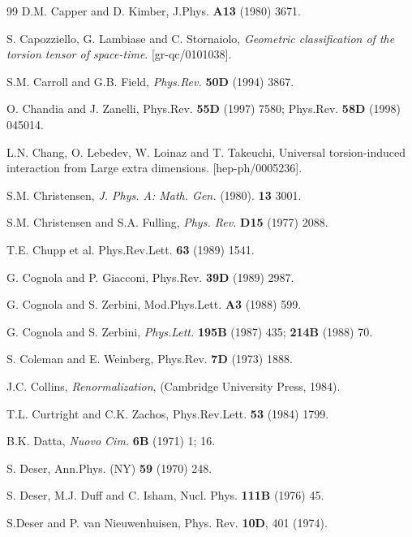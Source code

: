 \begin{thebibliography}{99}
D.M. Capper and D. Kimber, J.Phys. {\bf A13} (1980) 3671.

 S. Capozziello, G. Lambiase and C. Stornaiolo,
{\sl Geometric classification of the torsion tensor of space-time}.
[gr-qc/0101038].

S.M. Carroll and G.B. Field, {\sl Phys.Rev.} {\bf 50D} (1994) 3867.

O. Chandia and J. Zanelli, Phys.Rev. {\bf 55D} (1997) 7580;
Phys.Rev. {\bf 58D} (1998) 045014.

L.N. Chang, O. Lebedev, W. Loinaz and T. Takeuchi,
Universal torsion-induced interaction from Large extra dimensions.
[hep-ph/0005236]. 

 S.M. Christensen, {\sl J. Phys. A: Math. Gen.} (1980).
{\bf 13} 3001.

 S.M. Christensen and S.A. Fulling, 
{\sl Phys. Rev.} {\bf D15} (1977) 2088.

T.E.  Chupp et al. Phys.Rev.Lett. 
{\bf 63} (1989) 1541.

G. Cognola and P. Giacconi,  Phys.Rev. {\bf 39D} (1989) 2987.

G. Cognola and S. Zerbini, Mod.Phys.Lett. {\bf A3} (1988) 599.

 G. Cognola and S. Zerbini,
{\sl Phys.Lett.} {\bf 195B} (1987) 435; {\bf 214B} (1988) 70.

S. Coleman and E. Weinberg, Phys.Rev. {\bf 7D} (1973) 1888.

 J.C. Collins, {\sl Renormalization}, (Cambridge 
University Press, 1984). 

 T.L. Curtright and C.K. Zachos, 
Phys.Rev.Lett. {\bf 53} (1984) 1799. %


B.K. Datta, {\sl Nuovo Cim.} {\bf 6B} (1971) 1; 16.

 S. Deser, Ann.Phys. (NY) {\bf 59} (1970) 248.

 S. Deser, M.J. Duff and C. Isham,
Nucl. Phys. {\bf 111B} (1976) 45.

 S.Deser and P. van Nieuwenhuisen,  Phys. Rev. 
      {\bf 10D}, 401 (1974).


\end{thebibliography}
